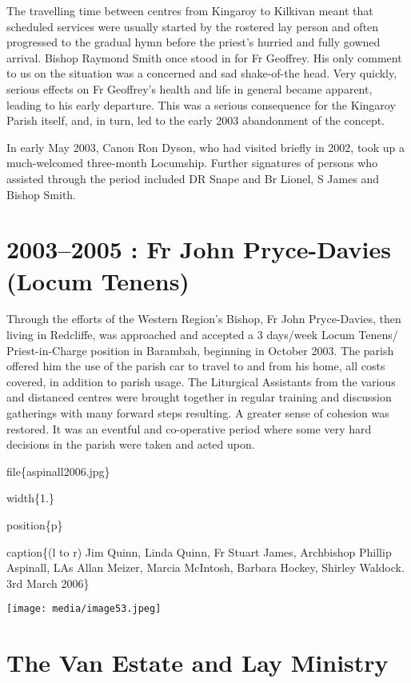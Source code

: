 The travelling time between centres from Kingaroy to Kilkivan meant that scheduled services were usually started by the rostered lay person and often progressed to the gradual hymn before the priest's hurried and fully gowned arrival. Bishop Raymond Smith once stood in for Fr Geoffrey. His only comment to us on the situation was a concerned and sad shake-of-the head. Very quickly, serious effects on Fr Geoffrey's health and life in general became apparent, leading to his early departure. This was a serious consequence for the Kingaroy Parish itself, and, in turn, led to the early 2003 abandonment of the concept.

In early May 2003, Canon Ron Dyson, who had visited briefly in 2002, took up a much-welcomed three-month Locumship. Further signatures of persons who assisted through the period included DR Snape and Br Lionel, S James and Bishop Smith.

\hypertarget{fr-john-pryce-davies-locum-tenens}{%
\section{2003--2005 : Fr John Pryce-Davies (Locum Tenens)}\label{fr-john-pryce-davies-locum-tenens}}

Through the efforts of the Western Region's Bishop, Fr John Pryce-Davies, then living in Redcliffe, was approached and accepted a 3 days/week Locum Tenens/ Priest-in-Charge position in Barambah, beginning in October 2003. The parish offered him the use of the parish car to travel to and from his home, all costs covered, in addition to parish usage. The Liturgical Assistants from the various and distanced centres were brought together in regular training and discussion gatherings with many forward steps resulting. A greater sense of cohesion was restored. It was an eventful and co-operative period where some very hard decisions in the parish were taken and acted upon.

file\{aspinall2006.jpg\}

width\{1.\}

position\{p\}

caption\{(l to r) Jim Quinn, Linda Quinn, Fr Stuart James, Archbishop Phillip Aspinall, LAs Allan Meizer, Marcia McIntosh, Barbara Hockey, Shirley Waldock. 3rd March 2006\}

\texttt{[image: media/image53.jpeg]}

\hypertarget{the-van-estate-and-lay-ministry}{%
\section{The Van Estate and Lay Ministry}\label{the-van-estate-and-lay-ministry}}


